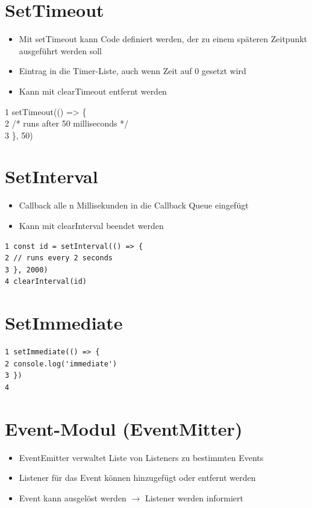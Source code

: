 \documentclass[10pt]{article}
\begin{document}
\section*{SetTimeout}
\begin{itemize}
  \item Mit setTimeout kann Code definiert werden, der zu einem späteren Zeitpunkt ausgeführt werden soll
  \item Eintrag in die Timer-Liste, auch wenn Zeit auf 0 gesetzt wird
  \item Kann mit clearTimeout entfernt werden
\end{itemize}

1 setTimeout(() => \{\\
2 /* runs after 50 milliseconds */\\
3 \}, 50)

\section*{SetInterval}
\begin{itemize}
  \item Callback alle n Millisekunden in die Callback Queue eingefügt
  \item Kann mit clearInterval beendet werden
\end{itemize}

\begin{verbatim}
1 const id = setInterval(() => {
2 // runs every 2 seconds
3 }, 2000)
4 clearInterval(id)
\end{verbatim}

\section*{SetImmediate}
\begin{verbatim}
1 setImmediate(() => {
2 console.log('immediate')
3 })
4
\end{verbatim}

\section*{Event-Modul (EventMitter)}
\begin{itemize}
  \item EventEmitter verwaltet Liste von Listeners zu bestimmten Events
  \item Listener für das Event können hinzugefügt oder entfernt werden
  \item Event kann ausgelöst werden $\rightarrow$ Listener werden informiert
\end{itemize}
\end{document}
